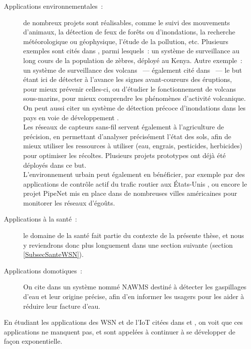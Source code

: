\begin{description}
\item[Applications environnementales~:] de nombreux projets sont
réalisables, comme le suivi des mouvements d'animaux, la détection de feux
de forêts ou d'inondations, la recherche météorologique ou géophysique,
l'étude de la pollution, etc. Plusieurs exemples sont cités dans
\cite{LivreAkyildiz2010}, parmi lesquels~:  \cite{ZebraNet}
un système de surveillance au long cours de la population de zèbres,
déployé au Kenya. Autre exemple~: un système de surveillance des volcans
\cite{VolcansWSN}~--- également cité dans \cite{LivreDargie2010}~---
le but étant ici de détecter à l'avance les signes avant-coureurs des
éruptions, pour mieux prévenir celles-ci, ou d'étudier le fonctionnement
de volcans sous-marins, pour mieux comprendre les phénomènes d'activité
volcanique. On peut aussi citer un système de détection précoce
d'inondations dans les pays en voie de développement \cite{FloodDetect}.\\
Les réseaux de capteurs sans-fil servent également à l'agriculture de
précision, en permettant d'analyser précisément l'état des sols, afin de
mieux utiliser les ressources à utiliser (eau, engrais, pesticides,
herbicides) pour optimiser les récoltes. Plusieurs projets prototypes
ont déjà été déployés dans ce but.\\
L'environnement urbain peut également en bénéficier, par exemple par des
applications de contrôle actif du trafic routier aux \'Etats-Unis
\cite{ControleTrafic}, ou encore le projet PipeNet \cite{PipeNet}
mis en place dans de nombreuses villes américaines pour monitorer
les réseaux d'égoûts.

\item[Applications à la santé~:] le domaine de la santé fait partie du
contexte de la présente thèse, et nous y reviendrons donc plus longuement
dans une section suivante (section \vref{SubsecSanteWSN}).

\item[Applications domotiques~:] On cite dans \cite{LivreAkyildiz2010}
un système nommé NAWMS \cite{NAWMS} destiné à détecter les gaspillages
d'eau et leur origine précise, afin d'en informer les usagers pour
les aider à réduire leur facture d'eau.

\end{description}

En étudiant les applications des WSN et de l'IoT citées dans
\cite{LivreDargie2010} et \cite{LivreAkyildiz2010}, on voit que ces
applications ne manquent pas, et sont appelées à continuer à se développer
de façon exponentielle.

